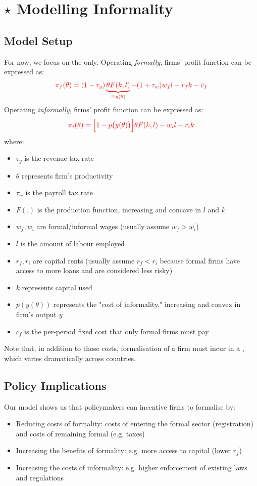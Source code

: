 \section{$\star$ Modelling Informality}
    \subsection{Model Setup}
        For now, we focus on the  only.
        Operating \emph{formally}, firms' profit function can be expressed as:
        $$\color{red} \pi_f(\theta) = (1-\tau_y)\underbrace{\theta F(k,l)}_{\equiv y(\theta)} - (1+\tau_w)w_fl -r_f k - \bar{c}_f$$
        Operating \emph{informally}, firms' profit function can be expressed as:
        $$\color{red} \pi_i(\theta) = \Big[1-p\big(y(\theta)\big)\Big]\theta F(k,l) - w_il -r_ik$$
        where:
        \begin{itemize}
            \item $\tau_y$ is the revenue tax rate
            \item $\theta$ represents firm's productivity
            \item $\tau_w$ is the payroll tax rate
            \item $F(.)$ is the production function, increasing and concave in $l$ and $k$
            \item $w_f, w_i$ are formal/informal wages (usually assume $w_f>w_i$)
            \item $l$ is the amount of labour employed
            \item $r_f, r_i$ are capital rents (usually assume $r_f<r_i$ because formal firms have access to more loans and are considered less risky)
            \item $k$ represents capital used
            \item $p(y(\theta))$ represents the "cost of informality," increasing and convex in firm's output $y$
            \item $\bar{c}_f$ is the per-period fixed cost that only formal firms must pay
        \end{itemize}
        Note that, in addition to those costs, formalisation of a firm must incur in a , which varies dramatically across countries.
    
    \subsection{Policy Implications}
        Our model shows us that policymakers can incentive firms to formalise by:
        \begin{itemize}
            \item Reducing costs of formality: costs of entering the formal sector (registration) and costs of remaining formal (e.g. taxes)
            \item Increasing the benefits of formality: e.g. more access to capital (lower $r_f$)
            \item Increasing the costs of informality: e.g. higher enforcement of existing laws and regulations
        \end{itemize}
        
